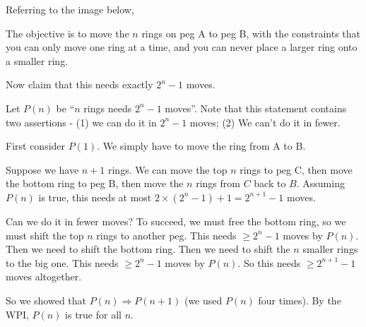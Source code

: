 \documentclass[a4paper]{article}
\begin{document}
\begin{eg}
  Referring to the image below,

  \begin{center}
    \usetikzlibrary{shapes}
  \end{center}

  The objective is to move the $n$ rings on peg A to peg B, with the constraints that you can only move one ring at a time, and you can never place a larger ring onto a smaller ring.

  Now claim that this needs exactly $2^n - 1$ moves.

  Let $P(n)$ be ``$n$ rings needs $2^n - 1$ moves''. Note that this statement contains two assertions - (1) we can do it in $2^n - 1$ moves; (2) We can't do it in fewer.

  First consider $P(1)$. We simply have to move the ring from A to B.

  Suppose we have $n + 1$ rings. We can move the top $n$ rings to peg C, then move the bottom ring to peg B, then move the $n$ rings from $C$ back to $B$. Assuming $P(n)$ is true, this needs at most $2\times (2^n - 1) + 1 = 2^{n + 1} -1 $ moves.

  Can we do it in fewer moves? To succeed, we must free the bottom ring, so we must shift the top $n$ rings to another peg. This needs $\geq 2^n - 1$ moves by $P(n)$. Then we need to shift the bottom ring. Then we need to shift the $n$ smaller rings to the big one. This needs $\geq 2^n - 1$ moves by $P(n)$. So this needs $\geq 2^{n + 1} - 1$ moves altogether.

  So we showed that $P(n)\Rightarrow P(n + 1)$ (we used $P(n)$ four times). By the WPI, $P(n)$ is true for all $n$.
\end{eg}
\end{document}
